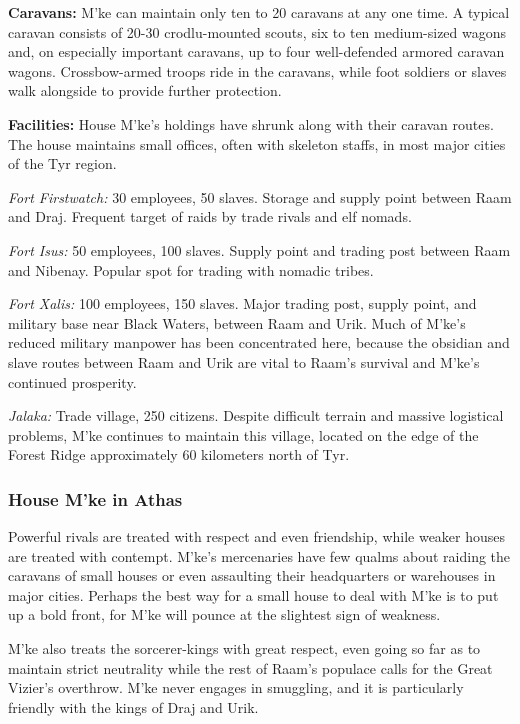 \textbf{Caravans:} M'ke can maintain only ten to 20 caravans at any one time. A typical caravan consists of 20-30 crodlu-mounted scouts, six to ten medium-sized wagons and, on especially important caravans, up to four well-defended armored caravan wagons. Crossbow-armed troops ride in the caravans, while foot soldiers or slaves walk alongside to provide further protection.

\textbf{Facilities:} House M'ke's holdings have shrunk along with their caravan routes. The house maintains small offices, often with skeleton staffs, in most major cities of the Tyr region.

\textit{Fort Firstwatch:} 30 employees, 50 slaves. Storage and supply point between Raam and Draj. Frequent target of raids by trade rivals and elf nomads.

\textit{Fort Isus:} 50 employees, 100 slaves. Supply point and trading post between Raam and Nibenay. Popular spot for trading with nomadic tribes.

\textit{Fort Xalis:} 100 employees, 150 slaves. Major trading post, supply point, and military base near Black Waters, between Raam and Urik. Much of M'ke's reduced military manpower has been concentrated here, because the obsidian and slave routes between Raam and Urik are vital to Raam's survival and M'ke's continued prosperity.

\textit{Jalaka:} Trade village, 250 citizens. Despite difficult terrain and massive logistical problems, M'ke continues to maintain this village, located on the edge of the Forest Ridge approximately 60 kilometers north of Tyr.

\subsubsection{House M'ke in Athas}
Powerful rivals are treated with respect and even friendship, while weaker houses are treated with contempt. M'ke's mercenaries have few qualms about raiding the caravans of small houses or even assaulting their headquarters or warehouses in major cities. Perhaps the best way for a small house to deal with M'ke is to put up a bold front, for M'ke will pounce at the slightest sign of weakness.

M'ke also treats the sorcerer-kings with great respect, even going so far as to maintain strict neutrality while the rest of Raam's populace calls for the Great Vizier's overthrow. M'ke never engages in smuggling, and it is particularly friendly with the kings of Draj and Urik.

